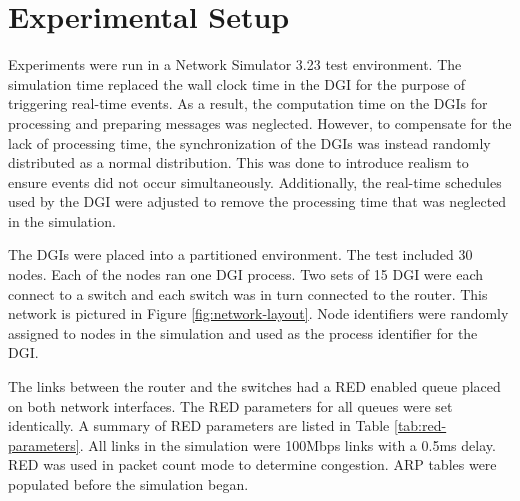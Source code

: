 
\section{Experimental Setup}
\label{sect:experimentalsetup}

Experiments were run in a Network Simulator 3.23\cite{NS3} test environment.
The simulation time replaced the wall clock time in the \ac{DGI} for the purpose of triggering real-time events.
As a result, the computation time on the \ac{DGI}s for processing and preparing messages was neglected.
However, to compensate for the lack of processing time, the synchronization of the \ac{DGI}s was instead randomly distributed as a normal distribution.
This was done to introduce realism to ensure events did not occur simultaneously.
Additionally, the real-time schedules used by the \ac{DGI} were adjusted to remove the processing time that was neglected in the simulation.

The \ac{DGI}s were placed into a partitioned environment.
The test included 30 nodes.
Each of the nodes ran one \ac{DGI} process.
Two sets of 15 \ac{DGI} were each connect to a switch and each switch was in turn connected to the router.
This network is pictured in Figure \ref{fig:network-layout}.
Node identifiers were randomly assigned to nodes in the simulation and used as the process identifier for the \ac{DGI}.

The links between the router and the switches had a \ac{RED} enabled queue placed on both network interfaces.
The \ac{RED} parameters for all queues were set identically.
A summary of \ac{RED} parameters are listed in Table \ref{tab:red-parameters}.
All links in the simulation were 100Mbps links with a 0.5ms delay.
RED was used in packet count mode to determine congestion.
ARP tables were populated before the simulation began.

